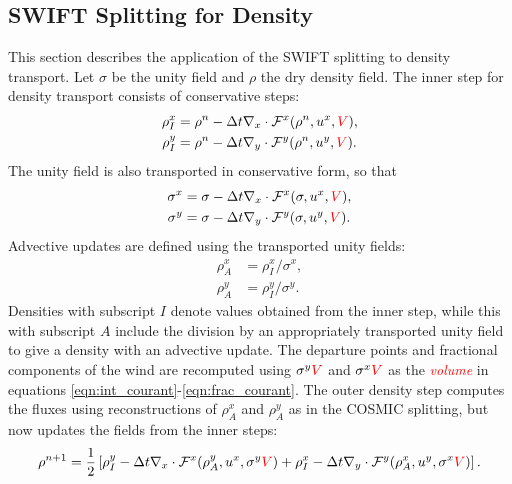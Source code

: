 \documentclass{ametsocV6.1}
\newcommand{\change}[1]{\textcolor{red}{#1}}
\begin{document}
\subsection{SWIFT Splitting for Density} \label{sec:swift_density}
This section describes the application of the SWIFT splitting to density transport.
Let $\sigma$ be the unity field and $\rho$ the dry density field.
The inner step for density transport consists of conservative steps:
\begin{subequations} \label{eqn:swift_density_inner}
\begin{align} \label{eqn:swift_density_x}
    \rho_I^x &= \rho^n - \Delta{t} \nabla_x\cdot \mathcal{F}^x(\rho^n, u^x,\change{V}), \\
    \rho_I^y &= \rho^n - \Delta{t} \nabla_y\cdot \mathcal{F}^y(\rho^n, u^y,\change{V}).
\end{align}
\end{subequations}
The unity field is also transported in conservative form, so that
\begin{subequations} \label{eqn:sigma_x_sigma_y}
\begin{align}
    \sigma^x &= \sigma - \Delta{t} \nabla_x\cdot \mathcal{F}^x(\sigma, u^x,\change{V}), \\
    \sigma^y &= \sigma - \Delta{t} \nabla_y\cdot \mathcal{F}^y(\sigma, u^y,\change{V}).
\end{align}
\end{subequations}
Advective updates are defined using the transported unity fields:
\begin{subequations}
\begin{align} \label{eqn:swift_density_adv_x}
    \rho^x_A &= \rho_I^x / \sigma^x, \\ \label{eqn:swift_density_adv_y}
    \rho^y_A &= \rho_I^y / \sigma^y.
\end{align}
\end{subequations}
Densities with subscript $I$ denote values obtained from the inner step, while this with subscript $A$ include the division by an appropriately transported unity field to give a density with an advective update.
The departure points and fractional components of the wind are recomputed using $\sigma^y\change{V}$ and $\sigma^x\change{V}$ as the \change{\textit{volume}} in equations \eqref{eqn:int_courant}-\eqref{eqn:frac_courant}.
The outer density step computes the fluxes using reconstructions of $\rho^x_A$ and $\rho^y_A$ as in the COSMIC splitting, but now updates the fields from the inner steps:
\begin{equation} \label{eqn:swift_density}
\rho^{n+1} = \frac{1}{2}\left[\rho_I^{y} - \Delta{t}\nabla_x\cdot \mathcal{F}^x(\rho^y_A, u^x, \sigma^y\change{V}) + \rho_I^x - \Delta{t}\nabla_y\cdot \mathcal{F}^y(\rho^x_A, u^y, \sigma^x\change{V})\right].
\end{equation}
\end{document}
